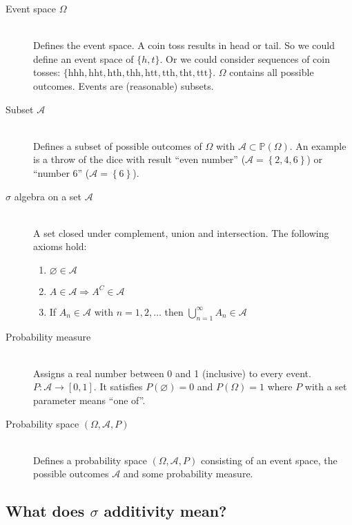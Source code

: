 \documentclass[a4paper]{article}
\newcommand\op[2][P]{\mathbb{#1}\left(#2\right)}
\newcommand\set[1]{\left\{#1\right\}}
\theoremstyle{definition}
\begin{document}
\begin{description}
  \item[Event space $\Omega$] \hfill{} \\
    Defines the event space. A coin toss results in head or tail. So we could define an event space of $\{h, t\}$. Or we could consider sequences of coin tosses: $\{\text{hhh}, \text{hht}, \text{hth}, \text{thh}, \text{htt}, \text{tth}, \text{tht}, \text{ttt}\}$. $\Omega$ contains all possible outcomes. Events are (reasonable) subsets.

  \item[Subset $\mathcal{A}$] \hfill{} \\
    Defines a subset of possible outcomes of $\Omega$ with $\mathcal{A} \subset \op{\Omega}$.
    An example is a throw of the dice with result \enquote{even number} ($\mathcal{A} = \set{2, 4, 6}$) or \enquote{number 6} ($\mathcal{A} = \set{6}$).

  \item[$\sigma$ algebra on a set $\mathcal{A}$] \hfill{} \\
    A set closed under complement, union and intersection. The following axioms hold:
    \begin{enumerate}
      \item $\varnothing \in \mathcal{A}$
      \item $A \in \mathcal{A} \Rightarrow A^C \in \mathcal{A}$
      \item If $A_n \in \mathcal{A}$ with $n = 1, 2, \ldots$ then $\bigcup_{n=1}^\infty A_n \in \mathcal{A}$
    \end{enumerate}

  \item[Probability measure] \hfill{} \\
    Assigns a real number between 0 and 1 (inclusive) to every event.
    $P: \mathcal{A} \rightarrow [0, 1]$.
    It satisfies $P(\varnothing) = 0$ and $P(\Omega) = 1$ where $P$ with a set parameter means \enquote{one of}.

  \item[Probability space $(\Omega, \mathcal{A}, P)$] \hfill{} \\
    Defines a probability space $(\Omega, \mathcal{A}, P)$ consisting of an event space, the possible outcomes $\mathcal{A}$ and some probability measure.
\end{description}

\subsection{What does $\sigma$ additivity mean?}
\end{document}
